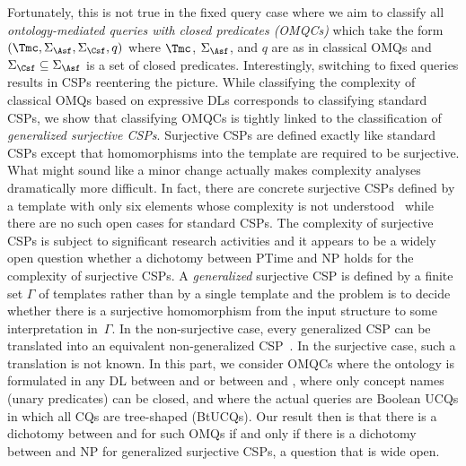 \documentclass{lmcs}
\theoremstyle{definition}
\begin{document}
Fortunately, this is not true in the fixed query case where we aim to
classify all \emph{ontology-mediated queries with closed predicates
  (OMQCs)} which take the form $(\Tmc,\Sigma_\Asf,\Sigma_\Csf,q)$
where $\Tmc$, $\Sigma_\Asf$, and $q$ are as in classical OMQs and
$\Sigma_\Csf \subseteq \Sigma_\Asf$ is a set of closed
predicates. Interestingly, switching to fixed queries results in CSPs
reentering the picture. While classifying the complexity of classical
OMQs based on expressive DLs corresponds to classifying standard CSPs,
we show that classifying
OMQCs %
is tightly linked to the classification of \emph{generalized
  surjective CSPs}. %
Surjective CSPs are defined exactly like standard CSPs except that
homomorphisms into the template are required to be surjective. What
might sound like a minor change actually makes complexity analyses
dramatically more difficult. In fact, there are concrete surjective
CSPs defined by a template with only six elements whose complexity is
not understood~\cite{bodirsky2012complexity} while there are no such
open cases for standard CSPs. The complexity of surjective CSPs is
subject to significant research activities
\cite{bodirsky2012complexity,chen2014algebraic} and it appears to be a
widely open question whether a dichotomy between {\sc PTime} and {\sc
  NP} holds for the complexity of surjective CSPs.  A
\emph{generalized} surjective CSP is defined by a finite set $\Gamma$
of templates rather than by a single template and the problem is to
decide whether there is a surjective homomorphism from the input
structure to some interpretation in~$\Gamma$. In the non-surjective
case, every generalized CSP can be translated into an equivalent
non-generalized CSP~\cite{DBLP:journals/ejc/FoniokNT08}. In the
surjective case, such a translation is not known. In this part, we
consider OMQCs where the ontology is formulated in any DL between
\dllitecore and \alchi or between \EL and \alchi, where only concept
names (unary predicates) can be closed, and where the actual queries
are Boolean UCQs in which all CQs are tree-shaped (BtUCQs). Our
result then is that there is a dichotomy between \PTime and \conp
for such OMQs if and only if there is a dichotomy between \PTime
and {\sc NP} for generalized surjective CSPs, a question that is wide
open.
%
\end{document}
